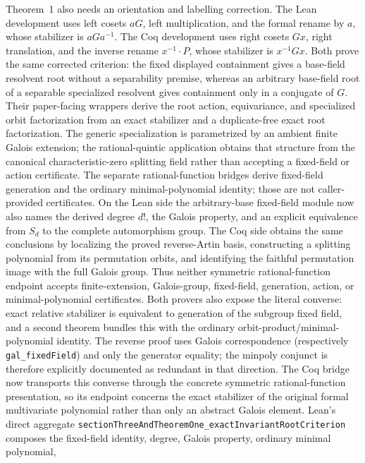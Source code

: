 \documentclass[11pt,a4paper,oneside]{article}
\newcommand{\lean}[1]{\nolinkurl{#1}}
\begin{document}
Theorem~1 also needs an orientation and labelling correction.  The Lean
development uses left cosets $aG$, left multiplication, and the formal rename
by $a$, whose stabilizer is $aGa^{-1}$.  The Coq development uses right
cosets $Gx$, right translation, and the inverse rename $x^{-1}\!\cdot P$,
whose stabilizer is $x^{-1}Gx$.  Both prove the same corrected criterion: the
fixed displayed containment gives a base-field resolvent root without a
separability premise, whereas an arbitrary base-field root of a separable
specialized resolvent gives containment only in a conjugate of $G$.  Their
paper-facing wrappers derive the root action, equivariance, and specialized
orbit factorization from an exact stabilizer and a duplicate-free exact root
factorization.  The generic specialization is parametrized by an ambient
finite Galois extension; the rational-quintic application obtains that
structure from the canonical characteristic-zero splitting field rather than
accepting a fixed-field or action certificate.  The separate
rational-function bridges derive fixed-field
generation and the ordinary minimal-polynomial identity; those are not
caller-provided certificates.  On the Lean side the arbitrary-base fixed-field
module now also names the derived degree $d!$, the Galois property, and an
explicit equivalence from $S_d$ to the complete automorphism group.  The Coq
side obtains the same conclusions by localizing the proved reverse-Artin
basis, constructing a splitting polynomial from its permutation orbits, and
identifying the faithful permutation image with the full Galois group.  Thus
neither symmetric rational-function endpoint accepts finite-extension,
Galois-group, fixed-field, generation, action, or minimal-polynomial
certificates.  Both provers also expose the literal converse: exact relative
stabilizer is equivalent to generation of the subgroup fixed field, and a
second theorem bundles this with the ordinary orbit-product/minimal-polynomial
identity.  The reverse proof uses Galois correspondence (respectively
\lean{gal_fixedField}) and only the generator equality; the minpoly
conjunct is therefore explicitly documented as redundant in that direction.
The Coq bridge now transports this converse through the concrete symmetric
rational-function presentation, so its endpoint concerns the exact stabilizer
of the original formal multivariate polynomial rather than only an abstract
Galois element.  Lean's direct aggregate
\lean{sectionThreeAndTheoremOne_exactInvariantRootCriterion} composes the
fixed-field identity, degree, Galois property, ordinary minimal polynomial,
\end{document}
